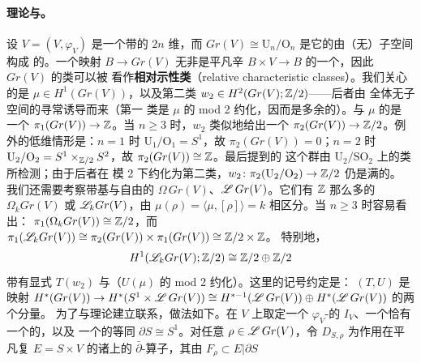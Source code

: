 \paragraph{\trIndex{}理论与\trLagrangianGrassmannian。}\label{sub:index-theory-grassmannian}
设 $V=(V,\varphi_V)$ 是一个带\trSymplecticStructure{}的 $2n$ 维\trVectorSpace，而
$Gr(V)\cong\mathrm{U}_n/\mathrm{O}_n$ 是它的由（无\trOrientation）\trLinear\trLagrange{}子空间构成
的\trGrassmann\trManifold。一个映射 $B\to Gr(V)$ 无非是平凡辛\trVectorBundle{}
$B\times V\to B$ 的一个\trLagrange\trSubbundle，因此 $Gr(V)$ 的\trCohomology{}类可以被
看作\textbf{相对示性类}（relative characteristic classes）。我们关心的是\trMaslovClass{}
$\mu\in H^1(Gr(V))$，以及第二\trStiefelWhitney{}类 $w_2\in H^2(Gr(V);\mathbb{Z}/2)$——后者由
全体无\trOrientation{}子空间的寻常\trGrassmann\trManifold{}诱导而来（第一%
\trStiefelWhitney{}类是 $\mu$ 的 mod 2 约化，因而是多余的）。与 $\mu$ 的\trPairing{}是
一个\trIsomorphism{} $\pi_1(Gr(V))\to\mathbb{Z}$。当 $n\ge 3$ 时，$w_2$ 类似地给出一个%
\trIsomorphism{} $\pi_2(Gr(V))\to\mathbb{Z}/2$。例外的低维情形是：$n=1$ 时
$\mathrm{U}_1/\mathrm{O}_1=S^1$，故 $\pi_2(Gr(V))=0$；$n=2$ 时
$\mathrm{U}_2/\mathrm{O}_2=S^1\times_{\mathbb{Z}/2}S^2$，故 $\pi_2(Gr(V))\cong\mathbb{Z}$。最后提到的
这个群由\trDoubleCover{} $\mathrm{U}_2/\mathrm{SO}_2$ 上的\trEuler{}类所检测；由于后者在
模 2 下约化为第二\trStiefelWhitney{}类，$w_2\colon\pi_2(\mathrm{U}_2/\mathrm{O}_2)\to\mathbb{Z}/2$
仍是满的。
我们还需要考察带基与自由的\trLoopSpace{} $\Omega\,Gr(V)$、$\mathscr{L}\,Gr(V)$。它们有
$\mathbb{Z}$ 那么多的\trConnectedComponent{} $\Omega_kGr(V)$ 或 $\mathscr{L}_kGr(V)$，由%
\trMaslovIndex{} $\mu(\rho)=\langle\mu,[\rho]\rangle=k$ 相区分。当 $n\ge 3$ 时容易看出：
$\pi_1(\Omega_kGr(V))\cong\mathbb{Z}/2$，而
$\pi_1(\mathscr{L}_kGr(V))\cong\pi_2(Gr(V))\times\pi_1(Gr(V))\cong\mathbb{Z}/2\times\mathbb{Z}$。
特别地，
\begin{equation}\label{eq:free-loop-cohomology}
H^1(\mathscr{L}_kGr(V);\mathbb{Z}/2)\cong\mathbb{Z}/2\oplus\mathbb{Z}/2
\end{equation}
带有显式\trGenerator{} $T(w_2)$ 与（$U(\mu)$ 的 mod 2 约化）。这里的记号约定是：
$(T,U)$ 是\trPullback{}映射 $H^*(Gr(V))\to H^*(S^1\times\mathscr{L}\,Gr(V))\cong
H^{*-1}(\mathscr{L}\,Gr(V))\oplus H^*(\mathscr{L}\,Gr(V))$ 的两个分量。
为了与\trIndex{}理论建立联系，做法如下。在 $V$ 上取定一个 $\varphi_V$-\trCompatible{}的%
\trComplexStructure{} $I_V$、一个恰有一个\trBoundaryComponent{}的\trCompact\trRiemann\trSurface，以及
一个\trOrientation{}的等同 $\partial S\cong S^1$。对任意 $\rho\in\mathscr{L}\,Gr(V)$，令
$D_{S,\rho}$ 为作用在平凡复\trVectorBundle{} $E=S\times V$ 的诸\trSection{}上的
$\bar\partial$-算子，其\trBoundaryCondition{}由\trLagrange\trSubbundle{} $F_\rho\subset E|\partial S$
